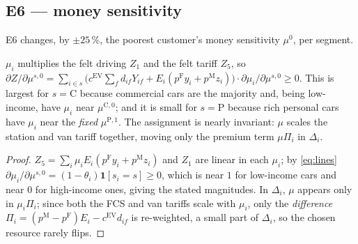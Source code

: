

\subsection{E6 --- money sensitivity}
\label{sec:e6}
E6 changes, by $\pm25$\,\%, the poorest customer's money sensitivity $\mu^{0}$, per segment.

\begin{proposition}
\label{prop:e6}
$\mu_i$ multiplies the felt driving $Z_1$ and the felt tariff $Z_5$, so $\partial Z/\partial\mu^{s,0}
=\sum_{i\in s}\big(c^{\mathrm{EV}}\!\sum_f d_{if}Y_{if}+E_i(p^{\mathrm F}y_i+p^{\mathrm M}z_i)\big)\cdot\partial\mu_i/\partial\mu^{s,0}\ge0$.
This is largest for $s=\mathrm C$ because commercial cars are the majority and, being low-income, have $\mu_i$ near
$\mu^{\mathrm C,0}$; and it is small for $s=\mathrm P$ because rich personal cars have $\mu_i$ near the \emph{fixed}
$\mu^{\mathrm P,1}$. The assignment is nearly invariant: $\mu$ scales the station and van tariff together, moving
only the premium term $\mu\Pi_i$ in $\Delta_i$.
\end{proposition}
\begin{proof}
$Z_5=\sum_i\mu_iE_i(p^{\mathrm F}y_i+p^{\mathrm M}z_i)$ and $Z_1$ are linear in each $\mu_i$; by \eqref{eq:lines}
$\partial\mu_i/\partial\mu^{s,0}=(1-\theta_i)\mathbf 1[s_i=s]\ge0$, which is near $1$ for low-income cars and near
$0$ for high-income ones, giving the stated magnitudes. In $\Delta_i$, $\mu$ appears only in $\mu_i\Pi_i$; since
both the FCS and van tariffs scale with $\mu_i$, only the \emph{difference} $\Pi_i=(p^{\mathrm M}-p^{\mathrm F})E_i-c^{\mathrm{EV}}d_{if}$
is re-weighted, a small part of $\Delta_i$, so the chosen resource rarely flips.
\end{proof}

